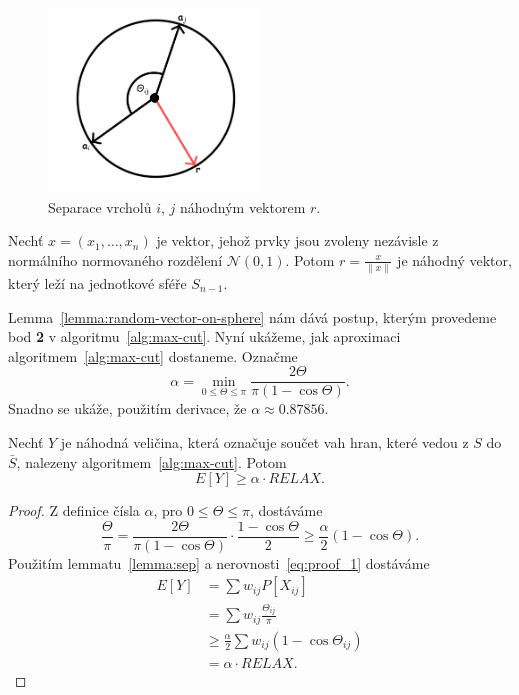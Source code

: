 \begin{figure}[h!]
    \centering
    \includegraphics[width=0.5\textwidth]{img/lemma_plane.png}   
    \caption{Separace vrcholů $i$, $j$ náhodným vektorem $r$.}
    \label{fig:lemma_plane}
\end{figure}

\begin{lm}[KNUTH 2, 135]
    Nechť $x = (x_1, \dots, x_n)$ je vektor, jehož prvky jsou zvoleny nezávisle z normálního normovaného rozdělení $\mathcal{N}(0,1)$. Potom $r = \frac{x}{\| x \|}$ je náhodný vektor, který leží na jednotkové sféře $S_{n-1}$.
    \label{lemma:random-vector-on-sphere}
\end{lm}

Lemma~\ref{lemma:random-vector-on-sphere} nám dává postup, kterým provedeme bod \textbf{2} v algoritmu~\ref{alg:max-cut}. Nyní ukážeme, jak  aproximaci algoritmem~\ref{alg:max-cut} dostaneme. Označme
$$
    \alpha = \min_{0 \leq \Theta \leq \pi} \frac{2 \Theta}{\pi (1 - \cos \Theta)}.
$$
Snadno se ukáže, použitím derivace, že $\alpha \approx 0.87856$.

\begin{lm}
    Nechť $Y$ je náhodná veličina, která označuje součet vah hran, které vedou z $S$ do $\bar{S}$, nalezeny algoritmem~\ref{alg:max-cut}. Potom
    $$
        E\left[ Y \right] \geq \alpha \cdot RELAX.
    $$
\end{lm}

\begin{proof}
    Z definice čísla $\alpha$, pro $0 \leq \Theta \leq \pi$, dostáváme
    \begin{equation}
        \frac{\Theta}{\pi} = \frac{2 \Theta}{\pi (1 - \cos \Theta)} \cdot \frac{1 - \cos \Theta}{2} \geq \frac{\alpha}{2} (1 - \cos \Theta).
        \label{eq:proof_1}
    \end{equation}
    Použitím lemmatu~\ref{lemma:sep} a nerovnosti~\ref{eq:proof_1} dostáváme
    \begin{equation*}
        \begin{split}
            E\left[ Y \right] &= \sum w_{ij} P\left[ X_{ij} \right] \\
                              &= \sum w_{ij} \frac{\Theta_{ij}}{\pi} \\
                              &\geq \frac{\alpha}{2} \sum w_{ij} (1 - \cos \Theta_{ij}) \\
                              &= \alpha \cdot RELAX.
        \end{split}
    \end{equation*}
\end{proof}

